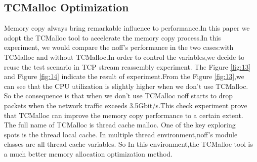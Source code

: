 \documentclass[conference]{IEEEtran}
\begin{document}
\subsection{TCMalloc Optimization}
Memory copy always bring remarkable influence to performance.In this paper we adopt the TCMalloc tool to accelerate the memory copy process.In this experiment, we 
would compare the noff's performance in the two cases:with TCMalloc and without TCMalloc.In order to control the variables,we decide to reuse the test scenario in TCP stream reassembly experiment.
\newline\indent The Figure \ref{fig:13} and Figure \ref{fig:14} indicate the result of experiment.From the Figure \ref{fig:13},we can see that the CPU utilization is slightly higher when we don't use TCMalloc. So the consequence is that when we don't use TCMalloc noff starts to drop packets when the network traffic exceeds 3.5Gbit/s.This check experiment prove that TCMalloc can improve the memory copy performance to a certain extent.
\newline\indent The full name of TCMalloc is thread cache malloc. One of the key  exploring spots is the thread local cache. In multiple thread environment,noff's module classes are all thread cache variables. So In this environment,the TCMalloc tool is a much better memory allocation optimization method.
\end{document}
